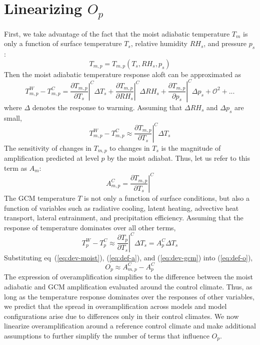 \documentclass[draft]{agujournal2019}
\begin{document}
\section{Linearizing $O_p$}
First, we take advantage of the fact that the moist adiabatic temperature $T_m$ is only a function of surface temperature $T_{s}$, relative humidity $RH_s$, and pressure $p_s$:
\begin{equation}
    T_{m,p} = T_{m,p}(T_s, RH_s, p_s)
\end{equation}
Then the moist adiabatic temperature response aloft can be approximated as
\begin{equation}
    T_{m,p}^W - T_{m,p}^C = \left.\frac{\partial T_{m,p}}{\partial T_s}\right|^C\Delta{T_s} + \left.\frac{\partial T_{m,p}}{\partial RH_s}\right|^C\Delta{RH_s} + \left.\frac{\partial T_{m,p}}{\partial p_s}\right|^C\Delta{p_s} + \mathcal{O}^2 + ...
\end{equation}
where $\Delta$ denotes the response to warming. Assuming that $\Delta{RH_s}$ and $\Delta{p_s}$ are small,
\begin{equation} \label{eq:dev-moist}
    T_{m,p}^W - T_{m,p}^C \approx \left.\frac{\partial T_{m,p}}{\partial T_s}\right|^C\Delta{T_s}
\end{equation}
The sensitivity of changes in $T_{m,p}$ to changes in $T_s$ is the magnitude of amplification predicted at level $p$ by the moist adiabat. Thus, let us refer to this term as $A_m$:
\begin{equation} \label{eq:def-a}
    A_{m,p}^C = \left.\frac{\partial T_{m,p}}{\partial T_s}\right|^C
\end{equation}
The GCM temperature $T$ is not only a function of surface conditions, but also a function of variables such as radiative cooling, latent heating, advective heat transport, lateral entrainment, and precipitation efficiency. Assuming that the response of temperature dominates over all other terms,
\begin{equation} \label{eq:dev-gcm}
    T_{p}^W - T_{p}^C \approx \left.\frac{\partial T_{p}}{\partial T_s}\right|^C\Delta{T_s} = A_p^C\Delta{T_s}
\end{equation}
Substituting eq~(\ref{eq:dev-moist}), (\ref{eq:def-a}), and (\ref{eq:dev-gcm}) into (\ref{eq:def-o}),
\begin{equation} \label{eq:simple-o}
    O_p \approx A_{m,p}^C - A_p^C
\end{equation}
The expression of overamplification simplifies to the difference between the moist adiabatic and GCM amplification evaluated around the control climate. Thus, as long as the temperature response dominates over the responses of other variables, we predict that the spread in overamplification across models and model configurations arise due to differences only in their control climates. We now linearize overamplification around a reference control climate and make additional assumptions to further simplify the number of terms that influence $O_p$.
\end{document}
